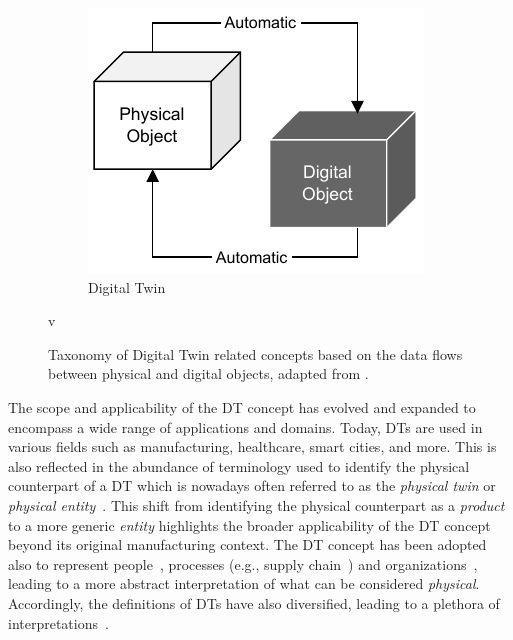 \begin{figure}[t]
\begin{subfigure}[b]{0.3\linewidth}
    \end{subfigure}
    \hfill
    \begin{subfigure}[b]{0.3\linewidth}
        \centering
        \includegraphics[width=\linewidth]{figures/kritzinger-digital-twin.pdf}
        \caption{Digital Twin}
        \label{fig:dt-taxonomy-digital-twin}
    \end{subfigure}
    \caption{Taxonomy of Digital Twin related concepts based on the data flows between physical and digital objects, adapted from \cite{kritzinger2018dtmanufacturing}.}
    \label{fig:dt-taxonomy}v
\end{figure}

The scope and applicability of the \ac{DT} concept has evolved and expanded
to encompass a wide range of applications and domains.
%
Today, \acp{DT} are used in various fields such as manufacturing, healthcare, smart cities, and more.
%
This is also reflected in the abundance of terminology used to identify the physical counterpart of a \ac{DT}
which is nowadays often referred to as the \emph{physical twin} or
\emph{physical entity}~\cite{Singh_Fuenmayor_Hinchy_Qiao_Murray_Devine_2021,JONES202036,DBLP:journals/jss/DaliborJRSWWW22}.
%
This shift from identifying the physical counterpart as a \emph{product} to a more generic \emph{entity}
highlights the broader applicability of the \ac{DT} concept beyond its original manufacturing context.
%
The \ac{DT} concept has been adopted also to represent people~\cite{Shengli_2021},
processes (e.g., supply chain~\cite{Barykin_Bochkarev_Kalinina_Yadykin_2020}) and organizations~\cite{Parmar_Leiponen_Thomas_2020}, leading to a more abstract interpretation of what can be considered \emph{physical}. 
%
Accordingly, the definitions of \acp{DT} have also diversified, leading to a plethora of interpretations~\cite{DBLP:journals/jss/DaliborJRSWWW22}. 

